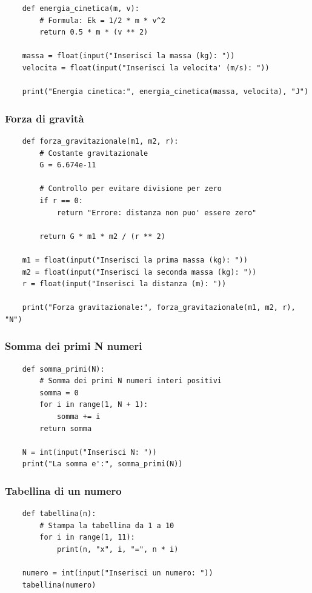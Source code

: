 \documentclass[a4paper,12pt]{article}
\begin{document}
\begin{lstlisting}
	def energia_cinetica(m, v):
		# Formula: Ek = 1/2 * m * v^2
		return 0.5 * m * (v ** 2)
	
	massa = float(input("Inserisci la massa (kg): "))
	velocita = float(input("Inserisci la velocita' (m/s): "))
	
	print("Energia cinetica:", energia_cinetica(massa, velocita), "J")
\end{lstlisting}

\newpage
\subsubsection{Forza di gravità}

\begin{lstlisting}
	def forza_gravitazionale(m1, m2, r):
		# Costante gravitazionale
		G = 6.674e-11
		
		# Controllo per evitare divisione per zero
		if r == 0:
			return "Errore: distanza non puo' essere zero"
		
		return G * m1 * m2 / (r ** 2)
	
	m1 = float(input("Inserisci la prima massa (kg): "))
	m2 = float(input("Inserisci la seconda massa (kg): "))
	r = float(input("Inserisci la distanza (m): "))
	
	print("Forza gravitazionale:", forza_gravitazionale(m1, m2, r), "N")
\end{lstlisting}

\newpage
\subsubsection{Somma dei primi N numeri}

\begin{lstlisting}
	def somma_primi(N):
		# Somma dei primi N numeri interi positivi
		somma = 0
		for i in range(1, N + 1):
			somma += i
		return somma
	
	N = int(input("Inserisci N: "))
	print("La somma e':", somma_primi(N))
\end{lstlisting}

\newpage
\subsubsection{Tabellina di un numero}

\begin{lstlisting}
	def tabellina(n):
		# Stampa la tabellina da 1 a 10
		for i in range(1, 11):
			print(n, "x", i, "=", n * i)
	
	numero = int(input("Inserisci un numero: "))
	tabellina(numero)
\end{lstlisting}
\end{document}
